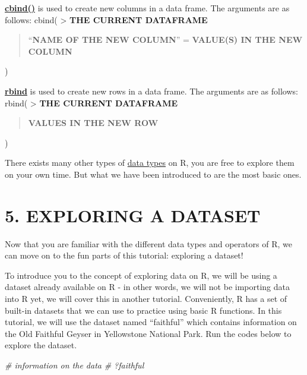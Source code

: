 \documentclass[
]{book}
\newenvironment{Shaded}{\begin{snugshade}}{\end{snugshade}}
\newcommand{\CommentTok}[1]{\textcolor[rgb]{0.56,0.35,0.01}{\textit{#1}}}
\begin{document}
\textbf{\href{https://www.rdocumentation.org/packages/base/versions/3.6.2/topics/cbind}{cbind()}} is used to create new columns in a data frame. The arguments are as follows:
cbind(
\textgreater{} \textbf{THE CURRENT DATAFRAME}

\begin{quote}
``\textbf{NAME OF THE NEW COLUMN}'' = \textbf{VALUE(S) IN THE NEW COLUMN}
\end{quote}

)

\textbf{\href{https://www.rdocumentation.org/packages/SparkR/versions/2.4.6/topics/rbind}{rbind}} is used to create new rows in a data frame. The arguments are as follows:
rbind(
\textgreater{} \textbf{THE CURRENT DATAFRAME}

\begin{quote}
\textbf{VALUES IN THE NEW ROW}
\end{quote}

)

There exists many other types of \href{https://www.statmethods.net/input/datatypes.html}{data types} on R, you are free to explore them on your own time. But what we have been introduced to are the most basic ones.

\hypertarget{exploring-a-dataset}{%
\section{5. EXPLORING A DATASET}\label{exploring-a-dataset}}

Now that you are familiar with the different data types and operators of R, we can move on to the fun parts of this tutorial: exploring a dataset!

To introduce you to the concept of exploring data on R, we will be using a dataset already available on R - in other words, we will not be importing data into R yet, we will cover this in another tutorial. Conveniently, R has a set of built-in datasets that we can use to practice using basic R functions. In this tutorial, we will use the dataset named ``faithful'' which contains information on the Old Faithful Geyser in Yellowstone National Park. Run the codes below to explore the dataset.

\begin{Shaded}
\begin{Highlighting}[]
\CommentTok{\# information on the data}
\CommentTok{\# ?faithful}
\end{Highlighting}
\end{Shaded}
\end{document}
